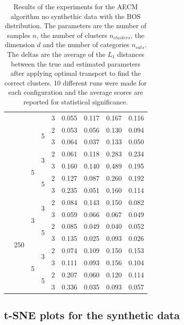 \begin{table}[H]
\begin{minipage}{.48\columnwidth}
\begin{adjustbox}{width=\columnwidth}
\begin{tabular}{lllllrrrr}
 &  &  &  & 3 & 0.055 & 0.117 & 0.167 & 0.116 \\
\cline{4-9}
 &  &  & \multirow[t]{2}{*}{5} & 2 & 0.053 & 0.056 & 0.130 & 0.094 \\
 &  &  &  & 3 & 0.064 & 0.037 & 0.133 & 0.050 \\
\cline{3-9} \cline{4-9}
 &  & \multirow[t]{4}{*}{5} & \multirow[t]{2}{*}{3} & 2 & 0.061 & 0.118 & 0.283 & 0.234 \\
 &  &  &  & 3 & 0.160 & 0.140 & 0.489 & 0.195 \\
\cline{4-9}
 &  &  & \multirow[t]{2}{*}{5} & 2 & 0.127 & 0.087 & 0.260 & 0.192 \\
 &  &  &  & 3 & 0.235 & 0.051 & 0.160 & 0.114 \\
\cline{2-9} \cline{3-9} \cline{4-9}
 & \multirow[t]{8}{*}{250} & \multirow[t]{4}{*}{3} & \multirow[t]{2}{*}{3} & 2 & 0.084 & 0.143 & 0.150 & 0.082 \\
 &  &  &  & 3 & 0.059 & 0.066 & 0.067 & 0.049 \\
\cline{4-9}
 &  &  & \multirow[t]{2}{*}{5} & 2 & 0.085 & 0.049 & 0.040 & 0.052 \\
 &  &  &  & 3 & 0.135 & 0.025 & 0.093 & 0.026 \\
\cline{3-9} \cline{4-9}
 &  & \multirow[t]{4}{*}{5} & \multirow[t]{2}{*}{3} & 2 & 0.074 & 0.109 & 0.150 & 0.153 \\
 &  &  &  & 3 & 0.111 & 0.093 & 0.156 & 0.104 \\
\cline{4-9}
 &  &  & \multirow[t]{2}{*}{5} & 2 & 0.207 & 0.060 & 0.120 & 0.114 \\
 &  &  &  & 3 & 0.336 & 0.035 & 0.093 & 0.057 \\
\cline{1-9} \cline{2-9} \cline{3-9} \cline{4-9}
\bottomrule
\end{tabular}
\end{adjustbox}
\caption{Results of the experiments for the AECM algorithm no synthethic data with the BOS distribution. The parameters are the number of samples $n$, the number of clusters $n_{clusters}$, the dimension $d$ and the number of categories $n_{cats}$. The deltas are the average of the $L_1$ distances between the true and estimated parameters after applying optimal transport to find the correct clusters. 10 different runs were made for each configuration and the average scores are reported for statistical significance.}
\label{tab:results_bos}
\end{minipage}
\end{table}

\subsection{t-SNE plots for the synthetic data}
\label{sec:appendix_tsne_synth}

